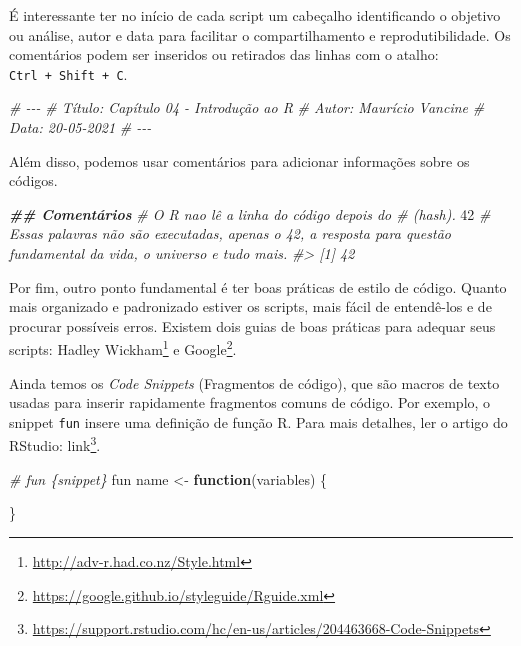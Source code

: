 \documentclass[
]{book}
\newenvironment{Shaded}{\begin{snugshade}}{\end{snugshade}}
\newcommand{\CommentTok}[1]{\textcolor[rgb]{0.37,0.37,0.37}{\textit{#1}}}
\newcommand{\ControlFlowTok}[1]{\textcolor[rgb]{0.27,0.27,0.27}{\textbf{#1}}}
\newcommand{\DecValTok}[1]{\textcolor[rgb]{0.06,0.06,0.06}{#1}}
\newcommand{\DocumentationTok}[1]{\textcolor[rgb]{0.37,0.37,0.37}{\textbf{\textit{#1}}}}
\newcommand{\NormalTok}[1]{#1}
\newcommand{\OtherTok}[1]{\textcolor[rgb]{0.37,0.37,0.37}{#1}}
\renewcommand{\href}[2]{#2\footnote{\url{#1}}}
\begin{document}
É interessante ter no início de cada script um cabeçalho identificando o objetivo ou análise, autor e data para facilitar o compartilhamento e reprodutibilidade. Os comentários podem ser inseridos ou retirados das linhas com o atalho: \texttt{Ctrl\ +\ Shift\ +\ C}.

\begin{Shaded}
\begin{Highlighting}[]
\CommentTok{\#\textquotesingle{} {-}{-}{-}}
\CommentTok{\#\textquotesingle{} Título: Capítulo 04 {-} Introdução ao R}
\CommentTok{\#\textquotesingle{} Autor: Maurício Vancine}
\CommentTok{\#\textquotesingle{} Data: 20{-}05{-}2021}
\CommentTok{\#\textquotesingle{} {-}{-}{-}}
\end{Highlighting}
\end{Shaded}

Além disso, podemos usar comentários para adicionar informações sobre os códigos.

\begin{Shaded}
\begin{Highlighting}[]
\DocumentationTok{\#\# Comentários}
\CommentTok{\# O R nao lê a linha do código depois do \# (hash).}
\DecValTok{42} \CommentTok{\# Essas palavras não são executadas, apenas o 42, a resposta para questão fundamental da vida, o universo e tudo mais.}
\CommentTok{\#\textgreater{} [1] 42}
\end{Highlighting}
\end{Shaded}

Por fim, outro ponto fundamental é ter boas práticas de estilo de código. Quanto mais organizado e padronizado estiver os scripts, mais fácil de entendê-los e de procurar possíveis erros. Existem dois guias de boas práticas para adequar seus scripts: \href{http://adv-r.had.co.nz/Style.html}{Hadley Wickham} e \href{https://google.github.io/styleguide/Rguide.xml}{Google}.

Ainda temos os \emph{Code Snippets} (Fragmentos de código), que são macros de texto usadas para inserir rapidamente fragmentos comuns de código. Por exemplo, o snippet \texttt{fun} insere uma definição de função R. Para mais detalhes, ler o artigo do RStudio: \href{https://support.rstudio.com/hc/en-us/articles/204463668-Code-Snippets}{link}.

\begin{Shaded}
\begin{Highlighting}[]
\CommentTok{\# fun \{snippet\}}
\NormalTok{fun}
\NormalTok{name }\OtherTok{\textless{}{-}} \ControlFlowTok{function}\NormalTok{(variables) \{}
    
\NormalTok{\}}
\end{Highlighting}
\end{Shaded}
\end{document}
